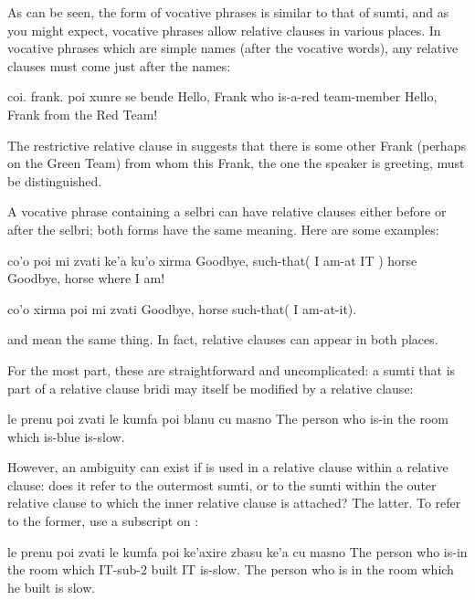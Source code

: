 As can be seen, the form of vocative phrases is similar to
    that of sumti, and as you might expect, vocative phrases allow
    relative clauses in various places. In vocative phrases which
    are simple names (after the vocative words), any relative
    clauses must come just after the names:
\begin{example}
coi. frank. poi xunre se bende\n
Hello, Frank who is-a-red team-member\n
Hello, Frank from the Red Team!
\end{example}

The restrictive relative clause in  suggests that there is some other Frank (perhaps on the
    Green Team) from whom this Frank, the one the speaker is
    greeting, must be distinguished.

A vocative phrase containing a selbri can have relative
    clauses either before or after the selbri; both forms have the
    same meaning. Here are some examples:
\begin{example}
co'o poi mi zvati ke'a ku'o xirma\n
Goodbye, such-that( I am-at IT ) horse\n
Goodbye, horse where I am!
\end{example}

\begin{example}
co'o xirma poi mi zvati\n
Goodbye, horse such-that( I am-at-it).
\end{example}

 and  mean the same thing. In fact, relative clauses can
    appear in both places.



For the most part, these are straightforward and
    uncomplicated: a sumti that is part of a relative clause bridi
    may itself be modified by a relative clause:
\begin{example}
le prenu poi zvati le kumfa poi blanu cu masno\n
The person who is-in the room which is-blue is-slow.
\end{example}

However, an ambiguity can exist if  is used in a
    relative clause within a relative clause: does it refer to the
    outermost sumti, or to the sumti within the outer relative
    clause to which the inner relative clause is attached? The
    latter. To refer to the former, use a subscript on :
\begin{example}
le prenu poi zvati le kumfa\n
\T	poi ke'axire zbasu ke'a cu masno\n
The person who is-in the room\n
\T	which IT-sub-2 built IT is-slow.\n
The person who is in the room which he built is slow.
\end{example}

